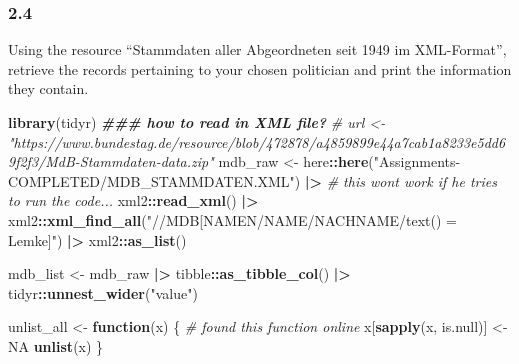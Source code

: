 \documentclass[
]{article}
\newenvironment{Shaded}{\begin{snugshade}}{\end{snugshade}}
\newcommand{\CommentTok}[1]{\textcolor[rgb]{0.56,0.35,0.01}{\textit{#1}}}
\newcommand{\ConstantTok}[1]{\textcolor[rgb]{0.56,0.35,0.01}{#1}}
\newcommand{\ControlFlowTok}[1]{\textcolor[rgb]{0.13,0.29,0.53}{\textbf{#1}}}
\newcommand{\DocumentationTok}[1]{\textcolor[rgb]{0.56,0.35,0.01}{\textbf{\textit{#1}}}}
\newcommand{\FunctionTok}[1]{\textcolor[rgb]{0.13,0.29,0.53}{\textbf{#1}}}
\newcommand{\NormalTok}[1]{#1}
\newcommand{\OtherTok}[1]{\textcolor[rgb]{0.56,0.35,0.01}{#1}}
\newcommand{\SpecialCharTok}[1]{\textcolor[rgb]{0.81,0.36,0.00}{\textbf{#1}}}
\newcommand{\StringTok}[1]{\textcolor[rgb]{0.31,0.60,0.02}{#1}}
\begin{document}
\hypertarget{section-6}{%
\subsubsection{2.4}\label{section-6}}

Using the resource ``Stammdaten aller Abgeordneten seit 1949 im
XML-Format'', retrieve the records pertaining to your chosen politician
and print the information they contain.

\begin{Shaded}
\begin{Highlighting}[]
\FunctionTok{library}\NormalTok{(tidyr)}
\DocumentationTok{\#\#\# how to read in XML file?}
\CommentTok{\# url \textless{}{-} "https://www.bundestag.de/resource/blob/472878/a4859899e44a7cab1a8233e5dd69f2f3/MdB{-}Stammdaten{-}data.zip"}
\NormalTok{mdb\_raw }\OtherTok{\textless{}{-}}\NormalTok{ here}\SpecialCharTok{::}\FunctionTok{here}\NormalTok{(}\StringTok{"Assignments{-}COMPLETED/MDB\_STAMMDATEN.XML"}\NormalTok{) }\SpecialCharTok{|\textgreater{}}  \CommentTok{\# this wont work if he tries to run the code...}
\NormalTok{  xml2}\SpecialCharTok{::}\FunctionTok{read\_xml}\NormalTok{() }\SpecialCharTok{|\textgreater{}} 
\NormalTok{  xml2}\SpecialCharTok{::}\FunctionTok{xml\_find\_all}\NormalTok{(}\StringTok{"//MDB[NAMEN/NAME/NACHNAME/text() = \textquotesingle{}Lemke\textquotesingle{}]"}\NormalTok{) }\SpecialCharTok{|\textgreater{}} 
\NormalTok{  xml2}\SpecialCharTok{::}\FunctionTok{as\_list}\NormalTok{()}

\NormalTok{mdb\_list }\OtherTok{\textless{}{-}}\NormalTok{ mdb\_raw }\SpecialCharTok{|\textgreater{}} 
\NormalTok{  tibble}\SpecialCharTok{::}\FunctionTok{as\_tibble\_col}\NormalTok{() }\SpecialCharTok{|\textgreater{}} 
\NormalTok{  tidyr}\SpecialCharTok{::}\FunctionTok{unnest\_wider}\NormalTok{(}\StringTok{"value"}\NormalTok{)}

\NormalTok{unlist\_all }\OtherTok{\textless{}{-}} \ControlFlowTok{function}\NormalTok{(x) \{ }\CommentTok{\# found this function online}
\NormalTok{  x[}\FunctionTok{sapply}\NormalTok{(x, is.null)] }\OtherTok{\textless{}{-}} \ConstantTok{NA}
  \FunctionTok{unlist}\NormalTok{(x)}
\NormalTok{\}}


\end{Highlighting}
\end{Shaded}
\end{document}
